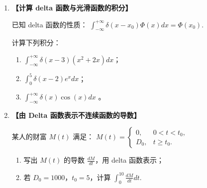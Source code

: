 \documentclass{article}
\begin{document}
\begin{enumerate}[label=\textbf{\arabic*.}]
设扩散方程：
\(
\frac{\partial u}{\partial \tau} = \frac{\partial^2 u}{\partial x^2}
\)
的初始条件为 delta 函数：
\(
u(x, 0) = \delta(x). 
\)

设解具有相似形式 \(u(x, \tau) = \tau^{-1/2} U(\xi)\)，其中 \(\xi = \frac{x}{\sqrt{\tau}}\). 

\begin{enumerate}[label=(\arabic*)]
    \item 求 \(\frac{\partial u}{\partial \tau}\) 和 \(\frac{\partial^2 u}{\partial x^2}\)；
    \item 化为常微分方程并求解；
    \item 利用归一化条件 \(\int_{-\infty}^{+\infty} u(x, \tau) dx = 1\) 确定常数，写出基本解。
\end{enumerate}



\item  {\bf{【计算 delta 函数与光滑函数的积分】}} %

已知 delta 函数的性质：
\(\displaystyle 
\int_{-\infty}^{+\infty} \delta(x - x_0) \Phi(x) dx = \Phi(x_0). 
\)

计算下列积分：

\begin{enumerate}[label=(\arabic*)]
    \item \(\int_{-\infty}^{+\infty} \delta(x - 3) (x^2 + 2x) dx\)；
    \item \(\int_{0}^{5} \delta(x - 2) e^{x} dx\)；
    \item \(\int_{-\infty}^{+\infty} \delta(x) \cos(x) dx\) 。
\end{enumerate}



\item  {\bf{【由 Delta 函数表示不连续函数的导数】}} %

某人的财富 \(M(t)\) 满足：
\(\displaystyle 
M(t) = \begin{cases} 0, & 0 < t < t_0, \\ D_0, & t \geqslant t_0. \end{cases} 
\)

\begin{enumerate}[label=(\arabic*)]
    \item 写出 \(M(t)\) 的导数 \(\frac{dM}{dt}\)，用 delta 函数表示；
    \item 若 \(D_0 = 1000\)，\(t_0 = 5\)，计算 \(\int_0^{10} \frac{dM}{dt} dt\). 
\end{enumerate}




\end{enumerate}
\end{document}
